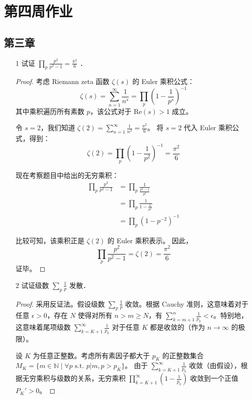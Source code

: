 \section{第四周作业}
\subsection*{第三章}

\begin{enumerate}
    \item[1] 试证 $\prod_p \frac{p^2}{p^2-1}=\frac{\pi^2}{6}$ ．
    \begin{proof}
        考虑 Riemann zeta 函数 $\zeta(s)$ 的 Euler 乘积公式：
        \[ \zeta(s) = \sum_{n=1}^{\infty} \frac{1}{n^s} = \prod_p \left(1 - \frac{1}{p^s}\right)^{-1} \]
        其中乘积遍历所有素数 $p$，该公式对于 $\text{Re}(s) > 1$ 成立。
        
        令 $s=2$，我们知道 $\zeta(2) = \sum_{n=1}^{\infty} \frac{1}{n^2} = \frac{\pi^2}{6}$。
        将 $s=2$ 代入 Euler 乘积公式，得到：
        \[ \zeta(2) = \prod_p \left(1 - \frac{1}{p^2}\right)^{-1} = \frac{\pi^2}{6} \]
        
        现在考察题目中给出的无穷乘积：
        \begin{align*}
            \prod_p \frac{p^2}{p^2-1} &= \prod_p \frac{1}{\frac{p^2-1}{p^2}} \\
            &= \prod_p \frac{1}{1 - \frac{1}{p^2}} \\
            &= \prod_p \left(1 - p^{-2}\right)^{-1}
        \end{align*}
        
        比较可知，该乘积正是 $\zeta(2)$ 的 Euler 乘积表示。
        因此，
        \[ \prod_p \frac{p^2}{p^2-1} = \zeta(2) = \frac{\pi^2}{6} \]
        证毕。
    \end{proof}
    \item[2] 试证级数 $\sum_p \frac{1}{p}$ 发散．

    \begin{proof}
        采用反证法。假设级数 $\sum_p \frac{1}{p}$ 收敛。根据 Cauchy 准则，这意味着对于任意 $\epsilon > 0$，存在 $N$ 使得对所有 $n > m \ge N$，有 $\sum_{k=m+1}^n \frac{1}{p_k} < \epsilon$。特别地，这意味着尾项级数 $\sum_{k=K+1}^\infty \frac{1}{p_k}$ 对于任意 $K$ 都是收敛的（作为 $n \to \infty$ 的极限）。
        
        设 $K$ 为任意正整数。考虑所有素因子都大于 $p_K$ 的正整数集合 $M_K = \{m \in \mathbb{N} \mid \forall p \text{ s.t. } p|m, p > p_K\}$。
        由于 $\sum_{k=K+1}^\infty \frac{1}{p_k}$ 收敛（由假设），根据无穷乘积与级数的关系，无穷乘积 $\prod_{k=K+1}^\infty (1 - \frac{1}{p_k})$ 收敛到一个正值 $P_K' > 0$。


\end{proof}
\end{enumerate}
